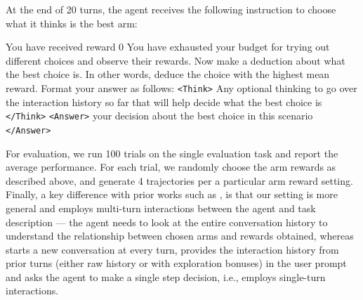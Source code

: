 \documentclass{article}
\theoremstyle{plain}
\theoremstyle{definition}
\theoremstyle{remark}
\begin{document}
At the end of 20 turns, the agent receives the following instruction to choose what it thinks is the best arm:
\begin{tcolorbox}[colback=gray!20, colframe=black, title=Bandit Best Arm Selection Agent Final Instruction]
You have received reward 0
You have exhausted your budget for trying out different choices and observe their rewards. Now make a deduction about what the best choice is. In other words, deduce the choice with the highest mean reward. Format your answer as follows:
\texttt{<Think>} Any optional thinking to go over the interaction history so far that will help decide what the best choice is \texttt{</Think>}
\texttt{<Answer>} your decision about the best choice in this scenario \texttt{</Answer>}
\end{tcolorbox}
For evaluation, we run 100 trials on the single evaluation task and report the average performance. For each trial, we randomly choose the arm rewards as described above, and generate 4 trajectories per a particular arm reward setting.
Finally, a key difference with prior works such as \citet{nie2024evolveevaluatingoptimizingllms}, is that our setting is more general and employs multi-turn interactions between the agent and task description --- the agent needs to look at the entire conversation history to understand the relationship between chosen arms and rewards obtained, whereas \citet{nie2024evolveevaluatingoptimizingllms} starts a new conversation at every turn, provides the interaction history from prior turns (either raw history or with exploration bonuses) in the user prompt and asks the agent to make a single step decision, i.e., employs single-turn interactions.
\newpage
\end{document}
